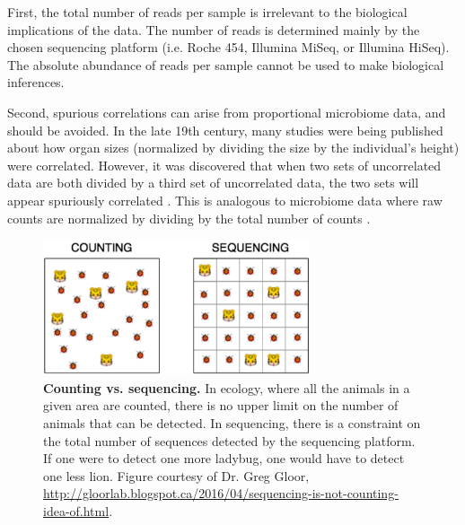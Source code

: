 First, the total number of reads per sample is irrelevant to the biological implications of the data. The number of reads is determined mainly by the chosen sequencing platform (i.e. Roche 454, Illumina MiSeq, or Illumina HiSeq). The absolute abundance of reads per sample cannot be used to make biological inferences.

Second, spurious correlations can arise from proportional microbiome data, and should be avoided. In the late 19th century, many studies were being published about how organ sizes (normalized by dividing the size by the individual's height) were correlated. However, it was discovered that when two sets of uncorrelated data are both divided by a third set of uncorrelated data, the two sets will appear spuriously correlated \cite{pearson1896mathematical}. This is analogous to microbiome data where raw counts are normalized by dividing by the total number of counts \cite{pearson1896mathematical}.

\begin{figure}[h]
\begin{center}
\includegraphics[width=0.7\textwidth]{lions_ladybugs.png}
\caption[Counting vs. sequencing.]{\textbf{Counting vs. sequencing.} In ecology, where all the animals in a given area are counted, there is no upper limit on the number of animals that can be detected. In sequencing, there is a constraint on the total number of sequences detected by the sequencing platform. If one were to detect one more ladybug, one would have to detect one less lion. Figure courtesy of Dr. Greg Gloor, \url{http://gloorlab.blogspot.ca/2016/04/sequencing-is-not-counting-idea-of.html}.}
\label{introduction_lions_ladybugs}
\end{center}
\end{figure}

